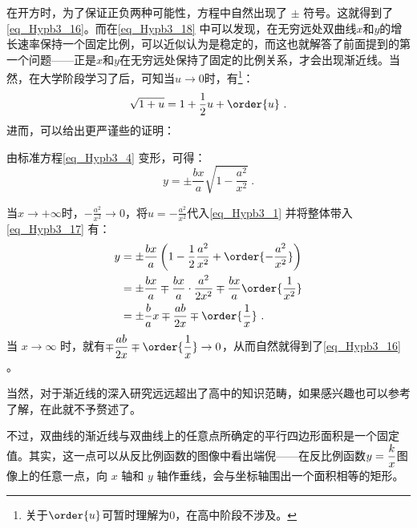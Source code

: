 在开方时，为了保证正负两种可能性，方程中自然出现了 $\pm$ 符号。这就得到了\autoref{eq_Hypb3_16}。而在\autoref{eq_Hypb3_18} 中可以发现，在无穷远处双曲线$x$和$y$的增长速率保持一个固定比例，可以近似认为是稳定的，而这也就解答了前面提到的第一个问题——正是$x$和$y$在无穷远处保持了固定的比例关系，才会出现渐近线。当然，在大学阶段学习了后，可知当$u\to 0$时，有\footnote{关于$\order{u}$可暂时理解为$0$，在高中阶段不涉及。}：
\begin{equation}\label{eq_Hypb3_1}
\sqrt{1+u} = 1+\frac{1}{2}u+\order{u}~.
\end{equation}
进而，可以给出更严谨些的证明：

由标准方程\autoref{eq_Hypb3_4} 变形，可得：
\begin{equation}\label{eq_Hypb3_17}
y = \pm\frac{bx}{a} \sqrt{1-\frac{a^2}{x^2}}~.
\end{equation}

当$x\to+\infty$时，$-\displaystyle\frac{a^2}{x^2}\to0$，将$\displaystyle u=-\frac{a^2}{x^2}$代入\autoref{eq_Hypb3_1} 并将整体带入\autoref{eq_Hypb3_17} 有：
\begin{equation}\label{eq_Hypb3_13}
\begin{split}
y &= \pm\frac{bx}{a}\left(1-\frac{1}{2}\frac{a^2}{x^2}+\order{-\frac{a^2}{x^2}}\right)\\
&=\pm\frac{bx}{a} \mp\frac{bx}{a} \cdot\frac{a^2}{2x^2}\mp\frac{bx}{a}\order{\frac{1}{x^2}}\\
& = \pm\frac ba x \mp \frac{ab}{2x} \mp \order{\frac{1}{x}}~.
\end{split}
\end{equation}
当 $x\to\infty$ 时，就有$\displaystyle\mp \frac{ab}{2x} \mp \order{\frac{1}{x}}\to0$，从而自然就得到了\autoref{eq_Hypb3_16} 。

当然，对于渐近线的深入研究远远超出了高中的知识范畴，如果感兴趣也可以参考了解，在此就不予赘述了。

不过，双曲线的渐近线与双曲线上的任意点所确定的平行四边形面积是一个固定值。其实，这一点可以从反比例函数的图像中看出端倪——在反比例函数$\displaystyle y={k\over x}$图像上的任意一点，向 $x$ 轴和 $y$ 轴作垂线，会与坐标轴围出一个面积相等的矩形。

